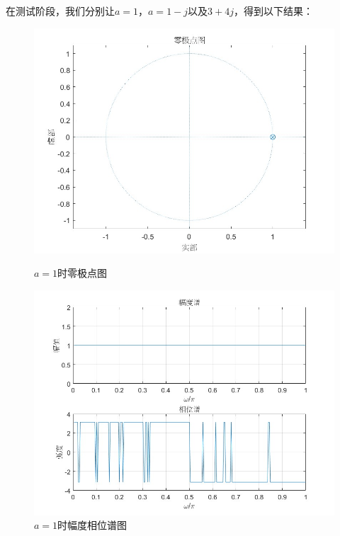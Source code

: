 \documentclass[a4paper,12pt]{article}
\begin{document}
在测试阶段，我们分别让$a = 1$，$a = 1 - j$以及$3 + 4j$，得到以下结果：
\begin{figure}[h]
    \centering
    \begin{minipage}[b]{0.48\textwidth}
        \centering
        \includegraphics[width=\linewidth]{images/3_Verify/allpass1_1.jpg}
        \caption{$a=1$时零极点图}
    \end{minipage}
    \hfill
    \begin{minipage}[b]{0.48\textwidth}
        \centering
        \includegraphics[width=\linewidth]{images/3_Verify/allpass1_2.jpg}
        \caption{$a=1$时幅度相位谱图}
    \end{minipage}

\end{figure}
\end{document}
